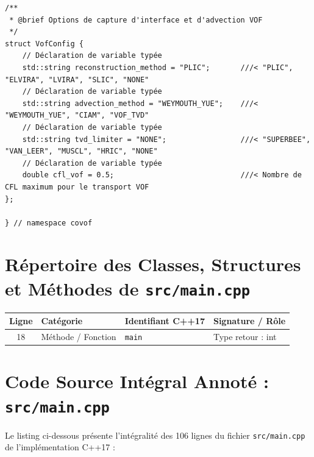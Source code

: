 \documentclass[10pt,a4paper,oneside]{book}
\begin{document}
\begin{lstlisting}[language={[11]C++}]
/**
 * @brief Options de capture d'interface et d'advection VOF
 */
struct VofConfig {
    // Déclaration de variable typée
    std::string reconstruction_method = "PLIC";       ///< "PLIC", "ELVIRA", "LVIRA", "SLIC", "NONE"
    // Déclaration de variable typée
    std::string advection_method = "WEYMOUTH_YUE";    ///< "WEYMOUTH_YUE", "CIAM", "VOF_TVD"
    // Déclaration de variable typée
    std::string tvd_limiter = "NONE";                 ///< "SUPERBEE", "VAN_LEER", "MUSCL", "HRIC", "NONE"
    // Déclaration de variable typée
    double cfl_vof = 0.5;                             ///< Nombre de CFL maximum pour le transport VOF
};

} // namespace covof

\end{lstlisting}

\section{Répertoire des Classes, Structures et Méthodes de \texttt{src/main.cpp}}
\begin{center}\small
\begin{tabular}{clll}
\toprule
\textbf{Ligne} & \textbf{Catégorie} & \textbf{Identifiant C++17} & \textbf{Signature / Rôle} \\
\midrule
18 & Méthode / Fonction & \texttt{main} & Type retour : int \\
\bottomrule
\end{tabular}
\end{center}

\section{Code Source Intégral Annoté : \texttt{src/main.cpp}}
Le listing ci-dessous présente l'intégralité des 106 lignes du fichier \texttt{src/main.cpp} de l'implémentation C++17 :
\end{document}

